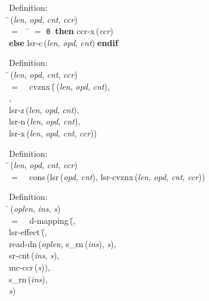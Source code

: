\begin{tabbing}{\sc Definition}: \\  
\=\,({\it{len\/}}, {\it{opd\/}}, {\it{cnt\/}}, {\it{ccr\/}}) \\ 
$=$$\;\;\;\;$\= $=$ {\tt{0}}$\;\;${\bf then }{\rm{ccr-x}}\,({\it{ccr\/}}) \\ 
{\bf else }{\rm{lsr-c}}\,({\it{len\/}}, {\it{opd\/}}, {\it{cnt\/}})$\;${\bf  endif}\-\-
\end{tabbing}
   
\begin{tabbing}{\sc Definition}: \\  
\=\,({\it{len\/}}, {\it{opd\/}}, {\it{cnt\/}}, {\it{ccr\/}}) \\ 
$=$$\;\;\;\;${\rm{cvznx}}\,(\=\,({\it{len\/}}, {\it{opd\/}}, {\it{cnt\/}}), \\ 
{}, \\ 
{\rm{lsr-z}}\,({\it{len\/}}, {\it{opd\/}}, {\it{cnt\/}}), \\ 
{\rm{lsr-n}}\,({\it{len\/}}, {\it{opd\/}}, {\it{cnt\/}}), \\ 
{\rm{lsr-x}}\,({\it{len\/}}, {\it{opd\/}}, {\it{cnt\/}}, {\it{ccr\/}}))\-\-
\end{tabbing}

\begin{tabbing}{\sc Definition}: \\  
\=\,({\it{len\/}}, {\it{opd\/}}, {\it{cnt\/}}, {\it{ccr\/}}) \\ 
$=$$\;\;\;\;${\rm{cons}}\,({\rm{lsr}}\,({\it{opd\/}}, {\it{cnt\/}}), {\rm{lsr-cvznx}}\,({\it{len\/}}, {\it{opd\/}}, {\it{cnt\/}}, {\it{ccr\/}}))\-
\end{tabbing}

\begin{tabbing}{\sc Definition}: \\  
\=\,({\it{oplen\/}}, {\it{ins\/}}, {\it{s\/}}) \\ 
$=$$\;\;\;\;${\rm{d-mapping}}\,(\=, \\ 
{\rm{lsr-effect}}\,(\=, \\ 
{\rm{read-dn}}\,({\it{oplen\/}}, {\rm{s\_rn}}\,({\it{ins\/}}), {\it{s\/}}), \\ 
{\rm{sr-cnt}}\,({\it{ins\/}}, {\it{s\/}}), \\ 
{\rm{mc-ccr}}\,({\it{s\/}}))\-, \\ 
{\rm{s\_rn}}\,({\it{ins\/}}), \\ 
{\it{s\/}})\-\-
\end{tabbing}

